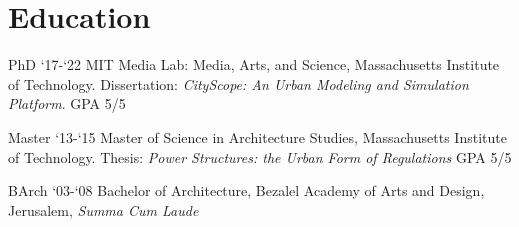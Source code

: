 \section*{Education}

\begin{tablist}

    \item[PhD] `17-`22 \tab MIT Media Lab: Media, Arts, and Science, Massachusetts Institute of Technology. Dissertation: \textit{CityScope: An Urban Modeling and Simulation Platform}. GPA 5/5
    \item[Master] `13-`15 \tab Master of Science in Architecture Studies, Massachusetts Institute of Technology. Thesis: \textit{Power Structures: the Urban Form of Regulations} GPA 5/5
    \item[BArch]  `03-`08  \tab Bachelor of Architecture, Bezalel Academy of Arts and Design, Jerusalem, \textit{Summa Cum Laude}

\end{tablist}
